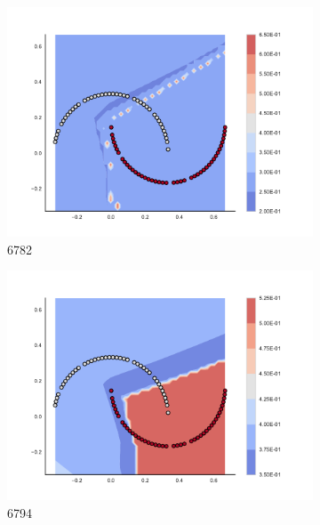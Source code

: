 \begin{figure}[h]
\begin{subfigure}[b]{0.09\textwidth}
    \includegraphics[clip, trim=2.35cm 1.75cm 4.5cm 0cm,width=\textwidth]{img/convergence/6782.pdf}
    \caption{6782}
    \label{fig:convergence_6782}
\end{subfigure}
%
\begin{subfigure}[b]{0.09\textwidth}
    \includegraphics[clip, trim=2.35cm 1.75cm 4.5cm 0cm,width=\textwidth]{img/convergence/6794.pdf}
    \caption{6794}
    \label{fig:convergence_6794}
\end{subfigure}
%
\begin{subfigure}[b]{0.09\textwidth}

\end{subfigure}
\end{figure}
